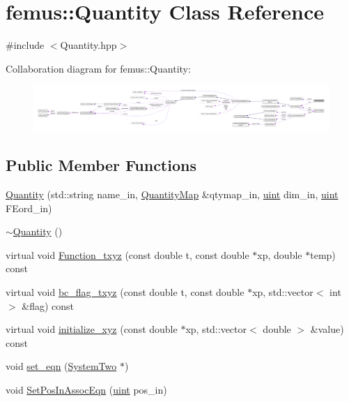 \hypertarget{classfemus_1_1_quantity}{}\section{femus\+:\+:Quantity Class Reference}
\label{classfemus_1_1_quantity}


{\ttfamily \#include $<$Quantity.\+hpp$>$}



Collaboration diagram for femus\+:\+:Quantity\+:
\nopagebreak
\begin{figure}[H]
\begin{center}
\leavevmode
\includegraphics[width=350pt]{classfemus_1_1_quantity__coll__graph}
\end{center}
\end{figure}
\subsection*{Public Member Functions}
\begin{DoxyCompactItemize}
\item 
\mbox{\hyperlink{classfemus_1_1_quantity_a4c7c6c1b89c12e1f1ed8df29d36b6c9e}{Quantity}} (std\+::string name\+\_\+in, \mbox{\hyperlink{classfemus_1_1_quantity_map}{Quantity\+Map}} \&qtymap\+\_\+in, \mbox{\hyperlink{_typedefs_8hpp_a91ad9478d81a7aaf2593e8d9c3d06a14}{uint}} dim\+\_\+in, \mbox{\hyperlink{_typedefs_8hpp_a91ad9478d81a7aaf2593e8d9c3d06a14}{uint}} F\+Eord\+\_\+in)
\item 
\mbox{\hyperlink{classfemus_1_1_quantity_a1603aa15c52a3f48faab214b59144618}{$\sim$\+Quantity}} ()
\item 
virtual void \mbox{\hyperlink{classfemus_1_1_quantity_aa0a592f1d473218253cbcb1e557a24f6}{Function\+\_\+txyz}} (const double t, const double $\ast$xp, double $\ast$temp) const
\item 
virtual void \mbox{\hyperlink{classfemus_1_1_quantity_af66356d64a9c4db62e3c6beba47acee9}{bc\+\_\+flag\+\_\+txyz}} (const double t, const double $\ast$xp, std\+::vector$<$ int $>$ \&flag) const
\item 
virtual void \mbox{\hyperlink{classfemus_1_1_quantity_adac02deb7a140ad0a28d2aaa793e7022}{initialize\+\_\+xyz}} (const double $\ast$xp, std\+::vector$<$ double $>$ \&value) const
\item 
void \mbox{\hyperlink{classfemus_1_1_quantity_a717be1d370eb986eaaebc7bc86bf3a1b}{set\+\_\+eqn}} (\mbox{\hyperlink{classfemus_1_1_system_two}{System\+Two}} $\ast$)
\item 
void \mbox{\hyperlink{classfemus_1_1_quantity_a78ac2de59d0f1216962caea2a82801b4}{Set\+Pos\+In\+Assoc\+Eqn}} (\mbox{\hyperlink{_typedefs_8hpp_a91ad9478d81a7aaf2593e8d9c3d06a14}{uint}} pos\+\_\+in)
\end{DoxyCompactItemize}
